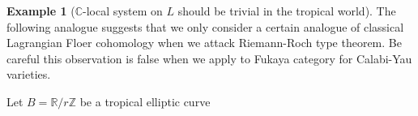 \documentclass[a4paper,dvipdfmx,reqno,12pt]{amsart}
\theoremstyle{definition}
\newtheorem{Eg}[Thm]{Example}
\newcommand{\C}{\mathbb{C}}%
\newcommand{\R}{\mathbb{R}}%
\newcommand{\Z}{\mathbb{Z}}%
\numberwithin{equation}{section}
\begin{document}
\begin{Eg}[{$\C$-local system on $L$ should be trivial in the tropical world}]
  The following analogue suggests that we only consider a certain analogue of classical Lagrangian Floer cohomology when we attack Riemann-Roch type theorem. Be careful this observation is false when we apply to Fukaya category for Calabi-Yau varieties.

  Let $B=\R/r\Z$ be a tropical elliptic curve

\end{Eg}




\printindex
\end{document}
